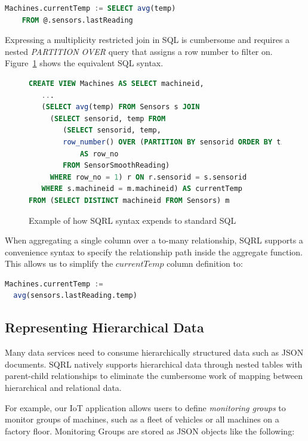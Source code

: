\documentclass[	DIV=calc,%
							paper=letter,%
							fontsize=11pt,%
							twocolumn]{scrartcl}	 					%
\begin{document}
\begin{lstlisting}[language=SQL]
Machines.currentTemp := SELECT avg(temp)
    FROM @.sensors.lastReading
\end{lstlisting}

Expressing a multiplicity restricted join in SQL is cumbersome and requires a nested \emph{PARTITION OVER} query that assigns a row number to filter on. Figure~\ref{fig:machinesPartitionOver} shows the equivalent SQL syntax.

\begin{figure}
\begin{lstlisting}[language=SQL]
CREATE VIEW Machines AS SELECT machineid,
   ...
   (SELECT avg(temp) FROM Sensors s JOIN
     (SELECT sensorid, temp FROM
        (SELECT sensorid, temp,
        row_number() OVER (PARTITION BY sensorid ORDER BY time_min DESC)
            AS row_no
        FROM SensorSmoothReading)
     WHERE row_no = 1) r ON r.sensorid = s.sensorid
   WHERE s.machineid = m.machineid) AS currentTemp
FROM (SELECT DISTINCT machineid FROM Sensors) m
\end{lstlisting}
\caption{Example of how SQRL syntax expends to standard SQL}
\label{fig:machinesPartitionOver}
\end{figure}

When aggregating a single column over a to-many relationship, SQRL supports a convenience syntax to specify the relationship path inside the aggregate function. This allows us to simplify the $currentTemp$ column definition to:

\begin{lstlisting}[language=SQL]
Machines.currentTemp :=
  avg(sensors.lastReading.temp)
\end{lstlisting}

\subsection{Representing Hierarchical Data}

Many data services need to consume hierarchically structured data such as JSON documents. SQRL natively supports hierarchical data through nested tables with parent-child relationships to eliminate the cumbersome work of mapping between hierarchical and relational data.

For example, our IoT application allows users to define \emph{monitoring groups} to monitor groups of machines, such as a fleet of vehicles or all machines on a factory floor. Monitoring Groups are stored as JSON objects like the following:
\end{document}
